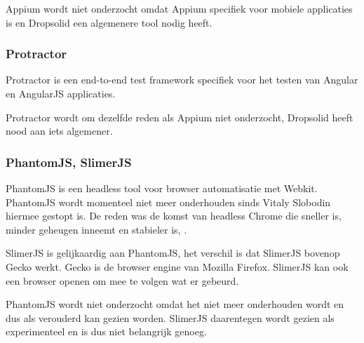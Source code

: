 Appium wordt niet onderzocht omdat Appium specifiek voor mobiele applicaties is en Dropsolid een algemenere \gls{tool} nodig heeft.


\subsubsection{Protractor}

Protractor is een end-to-end test \gls{framework} specifiek voor het testen van Angular en AngularJS applicaties.

Protractor wordt om dezelfde reden als Appium niet onderzocht, Dropsolid heeft nood aan iets algemener.

\subsubsection{PhantomJS, SlimerJS}
\label{phantomjs}
PhantomJS is een \gls{headless} \gls{tool} voor browser automatisatie met Webkit. PhantomJS wordt momenteel niet meer onderhouden sinds Vitaly Slobodin hiermee gestopt is. De reden was de komst van \gls{headless} Chrome die sneller is, minder geheugen inneemt en stabieler is, \textcite{Slobodin2017}.

SlimerJS is gelijkaardig aan PhantomJS, het verschil is dat SlimerJS bovenop Gecko werkt. Gecko is de browser engine van Mozilla Firefox. SlimerJS kan ook een browser openen om mee te volgen wat er gebeurd.

PhantomJS wordt niet onderzocht omdat het niet meer onderhouden wordt en dus als verouderd kan gezien worden. SlimerJS daarentegen wordt gezien als experimenteel en is dus niet belangrijk genoeg.





